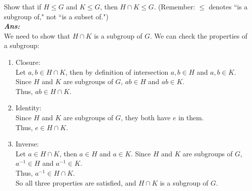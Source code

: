 \documentclass[12pt]{article}
\newcommand{\sol}{\setlength{\parindent}{0cm}\textbf{\textit{Ans:}}\setlength{\parindent}{1cm} }
\begin{document}
\begin{enumerate}[start=1,label={\bfseries Question \arabic*:},leftmargin=1in]
  
  \noindent Show that if $H \leq G$ and $K \leq G$, then $H \cap K \leq G$. 
  (Remember: $\leq$ denotes ``is a subgroup of," not ``is a subset of.")\\
  \sol{}\\
  We need to show that $H \cap K$ is a subgroup of $G$. We can check the properties of a subgroup:
  \begin{enumerate}
    \item Closure: \\
    Let \( a, b \in H \cap K \), then by definition of intersection \( a, b \in H \) and \( a, b \in K \). 
    Since \( H \) and \( K \) are subgroups of \( G \), \( ab \in H \) and \( ab \in K \).\\
    Thus, \( ab \in H \cap K \).
    \item Identity: \\
    Since \( H \) and \( K \) are subgroups of \( G \), they both have \( e \) in them.\\
    Thus, \( e \in H \cap K \).
    \item Inverse: \\
    Let \( a \in H \cap K \), then \( a \in H \) and \( a \in K \).
    Since \( H \) and \( K \) are subgroups of \( G \), \( a^{-1} \in H \) and \( a^{-1} \in K \).\\
    Thus, \( a^{-1} \in H \cap K \).\\
    So all three properties are satisfied, and \( H \cap K \) is a subgroup of \( G \).
  \end{enumerate}

\end{enumerate}
\end{document}

